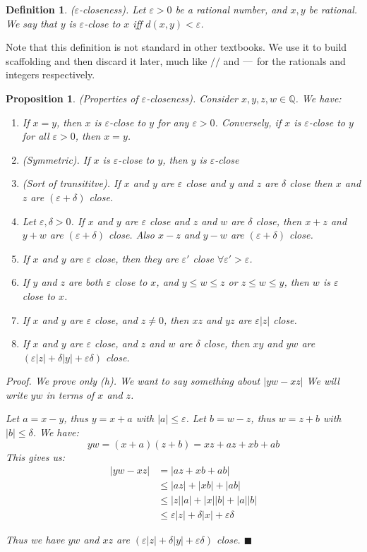 \documentclass{article}
\newtheorem{definition}{Definition}[subsection]
\newtheorem{proposition}{Proposition}[subsection]
\newcommand{\Q}{\mathbb{Q}}
\newcommand{\mem}{\text{\textemdash}} %
\newcommand{\vep}{\varepsilon} %
\let\it\textit
\begin{document}
\begin{definition}
	($\vep$-closeness). Let $\vep > 0$ be a rational number, and 
	$x,y$ be rational. We say that $y$ is $\vep$-close to $x$ 
	iff $d(x,y) < \vep$.
\end{definition}

Note that this definition is not standard in other textbooks. We 
use it to build scaffolding and then discard it later, much like 
$//$ and $\mem$ for the	rationals and integers respectively.

\begin{proposition}
	(Properties of $\vep$-closeness). Consider $x,y,z,w\in\Q$. We have:
	\begin{enumerate}[label=(\alph*)]
		\item  If $x=y$, then $x$ is $\vep$-close to $y$ for 
			any $\vep > 0$. Conversely, if $x$ is 
			$\vep$-close to $y$ for all $\vep > 0$, then
			$x=y$.
		\item (Symmetric). If $x$ is $\vep$-close to $y$, then 
			$y$ is $\vep$-close
		\item (Sort of transititve). If $x$ and $y$ 
			are $\vep$ close and $y$ and $z$ are $\delta$ 
			close then $x$ and $z$ are $(\vep + \delta)$ close.
		\item Let $\vep, \delta > 0$. If $x$ and $y$ are
			$\vep$ close and $z$ and $w$ are $\delta$ close,
			then $x+ z$ and $y +w$ are $(\vep + \delta)$ close.
			Also $x -z$ and $y-w$ are $(\vep + \delta)$ close.
		\item If $x$ and $y$ are $\vep$ close, then they
			are $\vep'$ close $\forall \vep' > \vep$.
		\item If $y$ and $z$ are both $\vep$ close to $x$, and 
			$y \leq w \leq z$ or $z \leq w \leq y$, then 
			$w$ is $\vep$ close to $x$.
		\item If $x$ and $y$ are $\vep$ close, and $z \neq 0$, then 
			$xz$ and $yz$ are $\vep|z|$ close.
		\item If $x$ and $y$ are $\vep$ close, and $z$ and $w$ 
			are $\delta$ close, then $xy$ and $yw$ are 
			$(\vep |z| + \delta |y| + \vep \delta)$ close.
	\end{enumerate}

	\it{Proof}. We prove only (h). We want to say something 
	about $|yw - xz|$ We will write $yw$ in terms of $x$ and $z$.
	
	Let $a = x-y$, thus $y = x +a$ with $|a| \leq \vep$. Let $b = w-z$,
	thus $w = z + b$ with $|b| \leq \delta$. We have:
	$$
	yw = (x+a)(z+b) = xz + az + xb + ab
	$$
	This gives us:
	\begin{align*}
		|yw - xz| &= |az + xb +ab | \\ 
			  &\leq |az| + |xb| + |ab|  \tag*{By triangle ineq}\\
			  &\leq |z||a| + |x||b| + |a||b| \tag*{By multiplicity} \\
			  &\leq \vep|z| + \delta|x| + \vep\delta
	\end{align*}

	Thus we have $yw$ and $xz$ are $(\vep |z| + \delta |y| + \vep \delta)$
	close. \hfill $\blacksquare$
\end{proposition}
\end{document}
